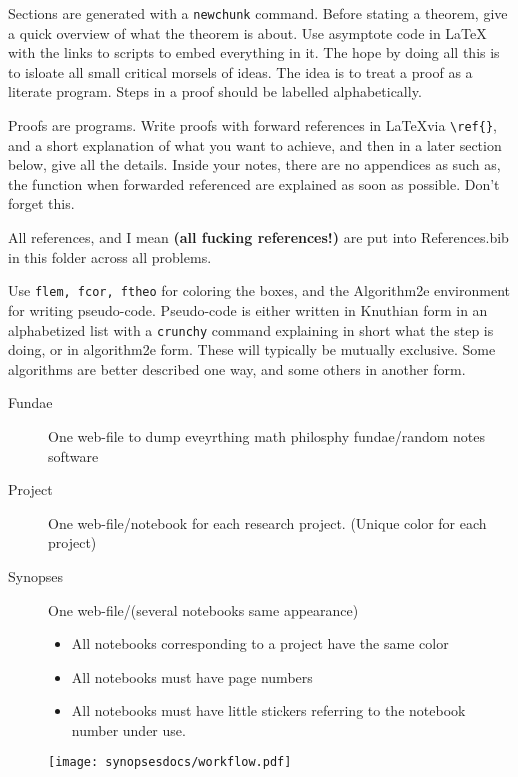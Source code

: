 \begin{appendices}
 Sections are generated with a \texttt{newchunk} command. Before stating a theorem, give a
 quick overview of what the theorem is about. Use asymptote code in LaTeX with the links to scripts
 to embed everything in it. The hope by doing all this is to isloate all small critical morsels of ideas.
 The idea is to treat a proof as a literate program. Steps in a proof should be labelled alphabetically. 

 Proofs are programs. Write proofs with forward references in \LaTeX via \verb|\ref{}|, and a short explanation
 of what you want to achieve, and then in a later section below, give all the details. Inside your notes, there
 are no appendices as such as, the function when forwarded referenced are explained as soon as possible.
 Don't forget this. 

 \newchunk All references, and I mean \textbf{(all fucking references!)} are put into References.bib in this folder
  across all problems. 
 
\newchunk Use \texttt{flem, fcor, ftheo} for coloring the boxes, and the Algorithm2e environment
for writing pseudo-code. Pseudo-code is either written in Knuthian form in an alphabetized
list with a \texttt{crunchy} command explaining in short what the step is doing, or in
algorithm2e form. These will typically be mutually exclusive. Some algorithms are better
described one way, and some others in another form. 

\newchunk

\begin{description}
\item[Fundae] One web-file to dump eveyrthing math philosphy fundae/random notes software
\item[Project]  One web-file/notebook for each research project. (Unique color for each project)
\item[Synopses] One web-file/(several notebooks same appearance)
  \begin{itemize}
  \item All notebooks corresponding to a project have the same color
  \item All notebooks must have page numbers
  \item All notebooks must have little stickers referring to the notebook number under use. 
  \end{itemize}
\end{description}

\begin{figure}
  \centering
  \texttt{[image: synopsesdocs/workflow.pdf]}
\end{figure}


\end{appendices}
